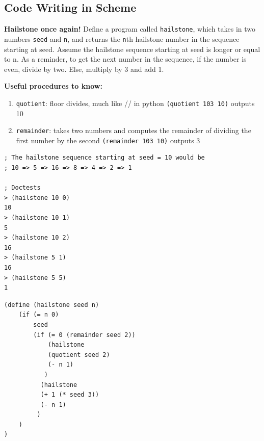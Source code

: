 \documentclass{exam}
\begin{document}
\begin{questions}
\section{Code Writing in Scheme}

\begin{blocksection}
\question \textbf{Hailstone once again!} Define a program called \texttt{hailstone}, which takes in two numbers \texttt{seed} and \texttt{n}, and returns the \texttt{n}th hailstone number in the sequence starting at seed. Assume the hailstone sequence starting at seed is longer or equal to n. As a reminder, to get the next number in the sequence, if the number is even, divide by two. Else, multiply by 3 and add 1. \newline

\textbf{Useful procedures to know:} \newline
\begin{enumerate}
\item \texttt{quotient}: floor divides, much like // in python
\subitem \texttt{(quotient 103 10)} outputs 10
\item \texttt{remainder}: takes two numbers and computes the remainder of dividing the first number by the second
\subitem \texttt{(remainder 103 10)} outputs 3
\end{enumerate}

\begin{nonsol}
\begin{lstlisting}
; The hailstone sequence starting at seed = 10 would be
; 10 => 5 => 16 => 8 => 4 => 2 => 1

; Doctests
> (hailstone 10 0)
10
> (hailstone 10 1)
5
> (hailstone 10 2)
16
> (hailstone 5 1)
16
> (hailstone 5 5)
1
\end{lstlisting}
\end{nonsol}

\begin{solution}[1in]
\begin{lstlisting}
(define (hailstone seed n)
    (if (= n 0)
        seed
        (if (= 0 (remainder seed 2))
            (hailstone
            (quotient seed 2)
            (- n 1)
           )
          (hailstone
          (+ 1 (* seed 3))
          (- n 1)
         )
    )
)
\end{lstlisting}
\end{solution}
\end{blocksection}


\end{questions}
\end{document}
